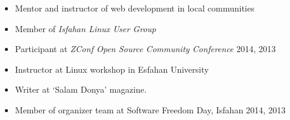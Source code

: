 \begin{itemize}
\item Mentor and instructor of web development in local communities
\item Member of {\it Isfahan Linux User Group} \\
\item Participant at {\it ZConf Open Source Community Conference} 2014, 2013 \\
\item Instructor at Linux workshop in Esfahan University \\
\item Writer at `Salam Donya' magazine. \\
\item Member of organizer team at Software Freedom Day, Isfahan 2014, 2013 \\
\end{itemize}







